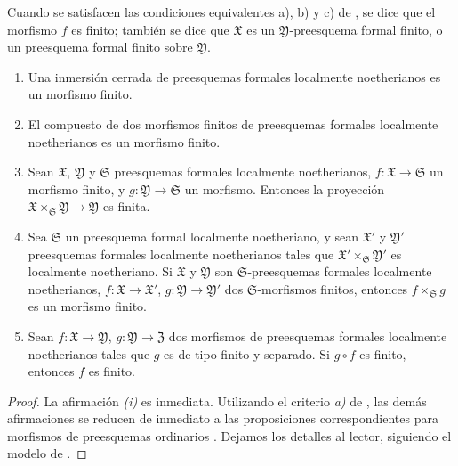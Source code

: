 \begin{definition}[4.8.2]
\label{III.4.8.2}
\label{III.4.8.2-fr}
Cuando se satisfacen las condiciones equivalentes \textup{a)}, \textup{b)} y \textup{c)}
de , se dice que el morfismo $f$ es
finito; también se dice que $\mathfrak X$ es un
$\mathfrak Y$-preesquema formal finito, o un preesquema
formal finito sobre $\mathfrak Y$.
\end{definition}

\begin{proposition}[4.8.3]
\label{III.4.8.3}
\label{III.4.8.3-fr}
\begin{enumerate}
  \item[\rm{(i)}] Una inmersión cerrada de preesquemas formales localmente
    noetherianos es un morfismo finito.
  \item[\rm{(ii)}] El compuesto de dos morfismos finitos de preesquemas formales
    localmente noetherianos es un morfismo finito.
  \item[\rm{(iii)}] Sean $\mathfrak X$, $\mathfrak Y$ y
    $\mathfrak S$ preesquemas formales localmente noetherianos,
    $f:\mathfrak X\to\mathfrak S$ un morfismo finito, y
    $g:\mathfrak Y\to\mathfrak S$ un morfismo. Entonces la proyección
    $\mathfrak X\times_{\mathfrak S}\mathfrak Y\to\mathfrak Y$
    es finita.
  \item[\rm{(iv)}] Sea $\mathfrak S$ un preesquema formal localmente
    noetheriano, y sean $\mathfrak X'$ y $\mathfrak Y'$
    preesquemas formales localmente noetherianos tales que
    $\mathfrak X'\times_{\mathfrak S}\mathfrak Y'$ es localmente
    noetheriano. Si $\mathfrak X$ y $\mathfrak Y$ son
    $\mathfrak S$-preesquemas formales localmente noetherianos,
  $f:\mathfrak X\to\mathfrak X'$, $g:\mathfrak Y\to\mathfrak Y'$ dos
  $\mathfrak S$-morfismos finitos, entonces
    $f\times_{\mathfrak S}g$ es un
  morfismo finito.
\item[\textup{(v)}] Sean $f:\mathfrak X\to\mathfrak Y$,
  $g:\mathfrak Y\to\mathfrak Z$ dos morfismos de preesquemas formales
  localmente noetherianos tales que $g$ es de tipo finito y separado. Si $g\circ f$ es finito,
    entonces $f$ es finito.
\end{enumerate}
\end{proposition}

\begin{proof}
La afirmación \emph{(i)} es inmediata. Utilizando el criterio \emph{a)} de
, las demás afirmaciones se reducen de inmediato a las
proposiciones correspondientes para morfismos de preesquemas ordinarios
. Dejamos los detalles al lector, siguiendo
el modelo de .
\end{proof}


